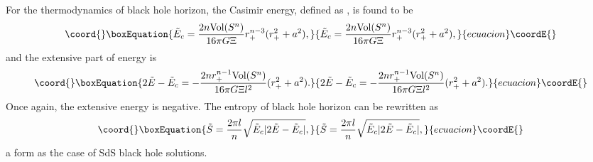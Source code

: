\documentclass[a4paper,12pt]{article}
\begin{document}
For the thermodynamics of black hole horizon, the Casimir energy, defined as \coordHE{}, is found to be
\begin{equation}\coord{}\boxEquation{
\tilde E_c= \frac{2n \mbox{Vol}(S^n)}{16\pi G \Xi}r_+^{n-3}(r_+^2+a^2),
}{
\tilde E_c= \frac{2n \mbox{Vol}(S^n)}{16\pi G \Xi}r_+^{n-3}(r_+^2+a^2),
}{ecuacion}\coordE{}\end{equation}
and the extensive part of energy is
\begin{equation}\coord{}\boxEquation{
2\tilde E-\tilde E_c=-\frac{2nr_+^{n-1}\mbox{Vol}(S^n)}{16\pi G\Xi l^2}(r_+^2+a^2).
}{
2\tilde E-\tilde E_c=-\frac{2nr_+^{n-1}\mbox{Vol}(S^n)}{16\pi G\Xi l^2}(r_+^2+a^2).
}{ecuacion}\coordE{}\end{equation}
Once again, the extensive energy is negative. The entropy \coordHE{} of black hole 
horizon can be rewritten as 
\begin{equation}\coord{}\boxEquation{
\label{4eq14}
\tilde S=\frac{2\pi l}{n}\sqrt{\tilde E_c|2\tilde E-\tilde E_c|},
}{
\tilde S=\frac{2\pi l}{n}\sqrt{\tilde E_c|2\tilde E-\tilde E_c|},
}{ecuacion}\coordE{}\end{equation}
a form as the case of SdS black hole solutions. 
\end{document}
